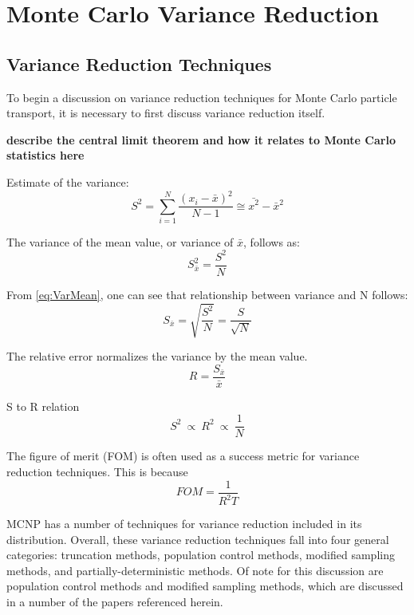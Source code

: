 \section{Monte Carlo Variance Reduction}

\subsection{Variance Reduction Techniques}
\label{sec:MCvar}

To begin a discussion on variance reduction techniques for Monte Carlo particle
transport,
it is necessary to first discuss variance reduction itself.

\textbf{describe the central limit theorem and how it relates to Monte Carlo
statistics here }

Estimate of the variance:
\begin{equation}
S^{ 2 }=\sum _{ i=1 }^{ N }{ \frac { (x_{ i }-\bar { x } )^{ 2 } }{ N-1 }  }
             \cong \bar{x^2}-\bar{x}^2
\label{eq:Var}
\end{equation}

The variance of the mean value, or variance of $\bar{x}$, follows as:
\begin{equation}
S^{ 2 }_{ \bar { x }  }=\frac{S^2}{N}
\label{eq:VarMean}
\end{equation}

From \ref{eq:VarMean}, one can see that relationship between variance and N follows:
\begin{equation}
S_{ \bar { x }  }=\sqrt { \frac { S^{ 2 } }{ N }  } =\frac { S }{ \sqrt { N }  }
\label{eq:VarN}
\end{equation}

The relative error normalizes the variance by the mean value.
\begin{equation}
R = \frac{S_{ \bar { x }  }}{\bar{x}}
\label{eq:RelativeErr}
\end{equation}

S to R relation
\begin{equation}
S^2\:\propto\: R^2\:\propto\:\frac{1}{N}
\label{eq:S to R}
\end{equation}

The figure of merit (FOM) is often used as a success metric for variance
reduction techniques.
This is because
\begin{equation}
FOM=\frac { 1 }{ R^{ 2 }T }
\label{eq:FOM}
\end{equation}

MCNP \cite{hendricks_mcnp_1985, brown_mcnp_2002} has a number of techniques for
variance
reduction included in its distribution. Overall, these variance reduction
techniques fall
into four general categories: truncation methods, population control methods, modified
sampling methods, and partially-deterministic methods. Of note for this discussion are
population control methods and modified sampling methods, which are discussed in
a number
of the papers referenced herein.

